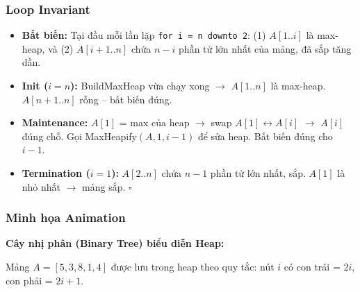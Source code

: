 \documentclass[10pt]{article}
\providecommand{\tightlist}{\setlength{\itemsep}{0pt}\setlength{\parskip}{0pt}}
\begin{document}
\subsubsection{Loop Invariant}
\begin{itemize}
\tightlist
\item \textbf{Bất biến:} Tại đầu mỗi lần lặp \texttt{for i = n downto 2}: (1) $A[1..i]$ là max-heap, và (2) $A[i{+}1..n]$ chứa $n{-}i$ phần tử lớn nhất của mảng, đã sắp tăng dần.
\item \textbf{Init ($i=n$):} BuildMaxHeap vừa chạy xong $\to$ $A[1..n]$ là max-heap. $A[n{+}1..n]$ rỗng -- bất biến đúng.
\item \textbf{Maintenance:} $A[1]$ = max của heap $\to$ swap $A[1] \leftrightarrow A[i]$ $\to$ $A[i]$ đúng chỗ. Gọi MaxHeapify$(A, 1, i{-}1)$ để sửa heap. Bất biến đúng cho $i{-}1$.
\item \textbf{Termination ($i=1$):} $A[2..n]$ chứa $n{-}1$ phần tử lớn nhất, sắp. $A[1]$ là nhỏ nhất $\to$ mảng sắp. $\square$
\end{itemize}

\subsubsection{Minh họa Animation}

\textbf{Cây nhị phân (Binary Tree) biểu diễn Heap:}

Mảng $A = [5, 3, 8, 1, 4]$ được lưu trong heap theo quy tắc: nút $i$ có con trái = $2i$, con phải = $2i+1$.
\end{document}
